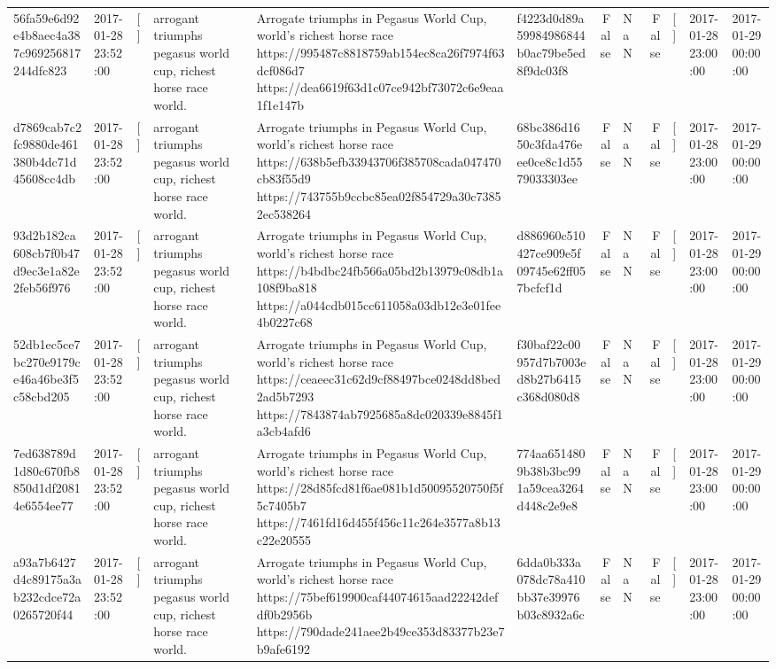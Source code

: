 \begin{tabular}{llllllrlrlll}
56fa59e6d92e4b8aec4a387c969256817244dfc823 & 2017-01-28 23:52:00 & [] & arrogant triumphs pegasus world cup, richest horse race world. & Arrogate triumphs in Pegasus World Cup, world's richest horse race https://995487c8818759ab154ec8ca26f7974f63dcf086d7 https://dea6619f63d1c07ce942bf73072c6e9eaa1f1e147b & f4223d0d89a59984986844b0ac79be5ed8f9dc03f8 & False & NaN & False & [] & 2017-01-28 23:00:00 & 2017-01-29 00:00:00 \\
d7869cab7c2fc9880de461380b4dc71d45608cc4db & 2017-01-28 23:52:00 & [] & arrogant triumphs pegasus world cup, richest horse race world. & Arrogate triumphs in Pegasus World Cup, world's richest horse race https://638b5efb33943706f385708cada047470cb83f55d9 https://743755b9ccbc85ea02f854729a30c73852ec538264 & 68bc386d1650c3fda476eee0ce8c1d5579033303ee & False & NaN & False & [] & 2017-01-28 23:00:00 & 2017-01-29 00:00:00 \\
93d2b182ca608cb7f0b47d9ec3e1a82e2feb56f976 & 2017-01-28 23:52:00 & [] & arrogant triumphs pegasus world cup, richest horse race world. & Arrogate triumphs in Pegasus World Cup, world's richest horse race https://b4bdbc24fb566a05bd2b13979c08db1a108f9ba818 https://a044cdb015cc611058a03db12e3e01fee4b0227c68 & d886960c510427ce909e5f09745e62ff057bcfcf1d & False & NaN & False & [] & 2017-01-28 23:00:00 & 2017-01-29 00:00:00 \\
52db1ec5ce7bc270e9179ce46a46be3f5c58cbd205 & 2017-01-28 23:52:00 & [] & arrogant triumphs pegasus world cup, richest horse race world. & Arrogate triumphs in Pegasus World Cup, world's richest horse race https://ceaeec31c62d9cf88497bce0248dd8bed2ad5b7293 https://7843874ab7925685a8dc020339e8845f1a3cb4afd6 & f30baf22c00957d7b7003ed8b27b6415c368d080d8 & False & NaN & False & [] & 2017-01-28 23:00:00 & 2017-01-29 00:00:00 \\
7ed638789d1d80c670fb8850d1df20814e6554ee77 & 2017-01-28 23:52:00 & [] & arrogant triumphs pegasus world cup, richest horse race world. & Arrogate triumphs in Pegasus World Cup, world's richest horse race https://28d85fcd81f6ae081b1d50095520750f5f5c7405b7 https://7461fd16d455f456c11c264e3577a8b13c22e20555 & 774aa6514809b38b3bc991a59cea3264d448c2e9e8 & False & NaN & False & [] & 2017-01-28 23:00:00 & 2017-01-29 00:00:00 \\
a93a7b6427d4c89175a3ab232cdce72a0265720f44 & 2017-01-28 23:52:00 & [] & arrogant triumphs pegasus world cup, richest horse race world. & Arrogate triumphs in Pegasus World Cup, world's richest horse race https://75bef619900caf44074615aad22242defdf0b2956b https://790dade241aee2b49ce353d83377b23e7b9afe6192 & 6dda0b333a078dc78a410bb37e39976b03c8932a6c & False & NaN & False & [] & 2017-01-28 23:00:00 & 2017-01-29 00:00:00 \\

\end{tabular}
